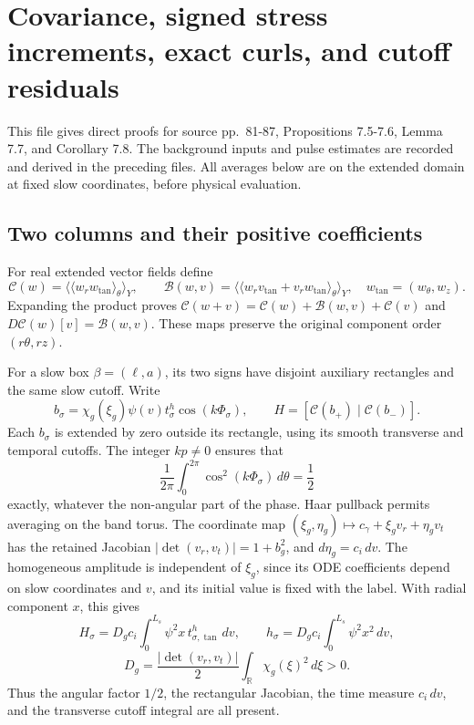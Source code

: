 \documentclass[10pt,a4paper]{article}
\begin{document}
\section{Covariance, signed stress increments, exact curls, and cutoff residuals}\label{covariance-signed-stress-increments-exact-curls-and-cutoff-residuals}

This file gives direct proofs for source pp.~81-87, Propositions 7.5-7.6, Lemma 7.7, and Corollary 7.8. The background inputs and pulse estimates are recorded and derived in the preceding files. All averages below are on the extended domain at fixed slow coordinates, before physical evaluation.

\subsection{Two columns and their positive coefficients}\label{two-columns-and-their-positive-coefficients}

For real extended vector fields define \[
\mathcal C(w)=\langle\langle w_rw_{\tan}\rangle_\theta\rangle_Y,\qquad
\mathcal B(w,v)=
\langle\langle w_rv_{\tan}+v_rw_{\tan}\rangle_\theta\rangle_Y,
\quad w_{\tan}=(w_\theta,w_z).
\] Expanding the product proves \(\mathcal C(w+v)=\mathcal C(w)+\mathcal B(w,v)+\mathcal C(v)\) and \(D\mathcal C(w)[v]=\mathcal B(w,v)\). These maps preserve the original component order \((r\theta,rz)\).

For a slow box \(\beta=(\ell,a)\), its two signs have disjoint auxiliary rectangles and the same slow cutoff. Write \[
b_\sigma=\chi_g(\xi_g)\psi(v)t_\sigma^h\cos(k\Phi_\sigma),\qquad
H=[\mathcal C(b_+)\mid\mathcal C(b_-)].
\] Each \(b_\sigma\) is extended by zero outside its rectangle, using its smooth transverse and temporal cutoffs. The integer \(kp\ne0\) ensures that \[
\frac1{2\pi}\int_0^{2\pi}\cos^2(k\Phi_\sigma)\,d\theta=\frac12
\] exactly, whatever the non-angular part of the phase. Haar pullback permits averaging on the band torus. The coordinate map \((\xi_g,\eta_g)\mapsto c_\gamma+\xi_gv_r+\eta_gv_t\) has the retained Jacobian \(|\det(v_r,v_t)|=1+b_g^2\), and \(d\eta_g=c_i\,dv\). The homogeneous amplitude is independent of \(\xi_g\), since its ODE coefficients depend on slow coordinates and \(v\), and its initial value is fixed with the label. With radial component \(x\), this gives \[
H_\sigma=D_g c_i\int_0^{L_s}\psi^2x\,t_{\sigma,\tan}^h\,dv,\qquad
h_\sigma=D_g c_i\int_0^{L_s}\psi^2x^2\,dv,
\] \[
D_g=\frac{|\det(v_r,v_t)|}{2}\int_{\mathbb R}\chi_g(\xi)^2\,d\xi>0.
\] Thus the angular factor \(1/2\), the rectangular Jacobian, the time measure \(c_i\,dv\), and the transverse cutoff integral are all present.
\end{document}

